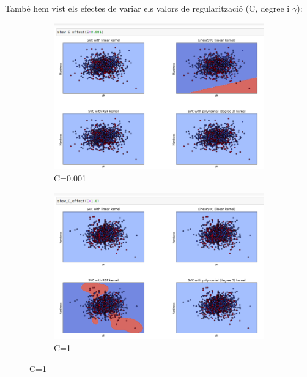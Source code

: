 \documentclass{article}
\begin{document}
\clearpage
També hem vist els efectes de variar els valors de regularització (C, degree i $\gamma$):\\
\begin{figure}[!h]
	\centering
	\begin{subfigure}[b]{0.4\textwidth}
		\centering
		\includegraphics[width=\textwidth]{../resultats/C=0.001}
		\caption*{C=0.001}
		\label{fig:knn}
	\end{subfigure}
	\begin{subfigure}[b]{0.4\textwidth}
		\centering
		\includegraphics[width=\textwidth]{../resultats/C=1}
		\caption*{C=1}
		\label{fig:three sin x}
	\end{subfigure}
\end{figure}
\end{document}
